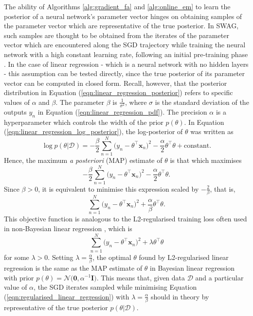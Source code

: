 \documentclass[msc,deptreport.inf]{infthesis} %
\newcommand{\matr}[1]{\mathbf{#1}}
\begin{document}
The ability of Algorithms \ref{alg:gradient_fa} and \ref{alg:online_em} to learn the posterior of a neural network's parameter vector hinges on obtaining samples of the parameter vector which are representative of the true posterior. In SWAG, such samples are thought to be obtained from the iterates of the parameter vector which are encountered along the SGD trajectory while training the neural network with a high constant learning rate, following an initial pre-training phase \cite{maddox2019}. In the case of linear regression - which is a neural network with no hidden layers - this assumption can be tested directly, since the true posterior of its parameter vector can be computed in closed form. Recall, however, that the posterior distribution in Equation (\ref{eqn:linear_regression_posterior}) refers to specific values of $\alpha$ and $\beta$. The parameter $\beta$ is $\frac{1}{\sigma^2}$, where $\sigma$ is the standard deviation of the outputs $y_n$ in Equation (\ref{eqn:linear_regression_pdf}). The precision $\alpha$ is a hyperparameter which controls the width of the prior $p(\theta)$. In Equation (\ref{eqn:linear_regression_log_posterior}), the log-posterior of $\theta$ was written as 
\begin{equation}
	\log p(\theta | \mathcal{D}) 
	= -\frac{\beta}{2} \sum_{n=1}^N \big(y_n - \theta^\intercal \matr{x}_n \big)^2 
	-\frac{\alpha}{2} \theta^\intercal \theta 
	+ \text{constant}.
\end{equation}
Hence, the maximum \emph{a posteriori} (MAP) estimate of $\theta$ is that which maximises
\begin{equation}
	-\frac{\beta}{2} \sum_{n=1}^N \big(y_n - \theta^\intercal \matr{x}_n \big)^2 
	-\frac{\alpha}{2} \theta^\intercal \theta.
\end{equation}
Since $\beta > 0$, it is equivalent to minimise this expression scaled by $-\frac{2}{\beta}$, that is,
\begin{equation}
	\sum_{n=1}^N \big(y_n - \theta^\intercal \matr{x}_n \big)^2 
	+ \frac{\alpha}{\beta} \theta^\intercal \theta.
\end{equation}
This objective function is analogous to the L2-regularised training loss often used in non-Bayesian linear regression \cite{barber2007}, which is 
\begin{equation}\label{eqn:regularised_linear_regression}
	\sum_{n=1}^N \big(y_n - \theta^\intercal \matr{x}_n \big)^2 
	+ \lambda \theta^\intercal \theta 
\end{equation}
for some $\lambda > 0$. Setting $\lambda = \frac{\alpha}{\beta}$, the optimal $\theta$ found by L2-regularised linear regression is the same as the MAP estimate of $\theta$ in Bayesian linear regression with prior $p(\theta) = \mathcal{N}\big(\matr{0}, \alpha^{-1} \matr{I} \big)$. This means that, given data $\mathcal{D}$ and a particular value of $\alpha$, the SGD iterates sampled while minimising Equation (\ref{eqn:regularised_linear_regression}) with $\lambda = \frac{\alpha}{\beta}$ should in theory by representative of the true posterior $p(\theta | \mathcal{D})$.
\end{document}
